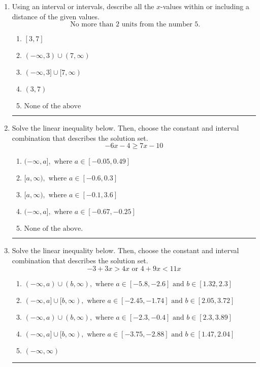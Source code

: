 \documentclass[14pt]{extbook}
\newcommand{\litem}[1]{\item#1\hspace*{-1cm}\rule{\textwidth}{0.4pt}}
\begin{document}
\begin{enumerate}
\litem{
Using an interval or intervals, describe all the $x$-values within or including a distance of the given values.\[ \text{ No more than } 2 \text{ units from the number } 5. \]\begin{enumerate}[label=\Alph*.]
\item \( [3, 7] \)
\item \( (-\infty, 3) \cup (7, \infty) \)
\item \( (-\infty, 3] \cup [7, \infty) \)
\item \( (3, 7) \)
\item \( \text{None of the above} \)

\end{enumerate} }
\litem{
Solve the linear inequality below. Then, choose the constant and interval combination that describes the solution set.\[ -6x -4 \geq 7x -10 \]\begin{enumerate}[label=\Alph*.]
\item \( (-\infty, a], \text{ where } a \in [-0.05, 0.49] \)
\item \( [a, \infty), \text{ where } a \in [-0.6, 0.3] \)
\item \( [a, \infty), \text{ where } a \in [-0.1, 3.6] \)
\item \( (-\infty, a], \text{ where } a \in [-0.67, -0.25] \)
\item \( \text{None of the above}. \)

\end{enumerate} }
\litem{
Solve the linear inequality below. Then, choose the constant and interval combination that describes the solution set.\[ -3 + 3 x > 4 x \text{ or } 4 + 9 x < 11 x \]\begin{enumerate}[label=\Alph*.]
\item \( (-\infty, a) \cup (b, \infty), \text{ where } a \in [-5.8, -2.6] \text{ and } b \in [1.32, 2.3] \)
\item \( (-\infty, a] \cup [b, \infty), \text{ where } a \in [-2.45, -1.74] \text{ and } b \in [2.05, 3.72] \)
\item \( (-\infty, a) \cup (b, \infty), \text{ where } a \in [-2.3, -0.4] \text{ and } b \in [2.3, 3.89] \)
\item \( (-\infty, a] \cup [b, \infty), \text{ where } a \in [-3.75, -2.88] \text{ and } b \in [1.47, 2.04] \)
\item \( (-\infty, \infty) \)


\end{enumerate}}
\end{enumerate}
\end{document}
